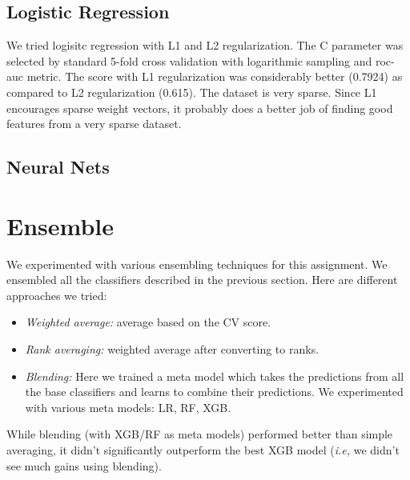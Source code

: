 \documentclass{article}
\begin{document}
\subsection{Logistic Regression}
We tried logisitc regression with L1 and L2 regularization. The C parameter was selected by standard 5-fold cross validation with logarithmic sampling and roc-auc metric. The score with L1 regularization was considerably better (0.7924) as compared to L2 regularization (0.615). The dataset is very sparse. Since L1 encourages sparse weight vectors, it probably does a better job of finding good features from a very sparse dataset.

\subsection{Neural Nets}
\section{Ensemble}
We experimented with various ensembling techniques for this assignment. We ensembled all the classifiers described in the previous section. Here are different approaches we tried:
\begin{itemize}
\item \textit{Weighted average:} average based on the CV score.
\item \textit{Rank averaging:} weighted average after converting to ranks.
\item \textit{Blending:} Here we trained a meta model which takes the predictions from all the base classifiers and learns to combine their predictions. We experimented with various meta models: LR, RF, XGB.
\end{itemize}
While blending (with XGB/RF as meta models) performed better than simple averaging, it didn't significantly outperform the best XGB model (\textit{i.e,} we didn't see much gains using blending). 
\end{document}

